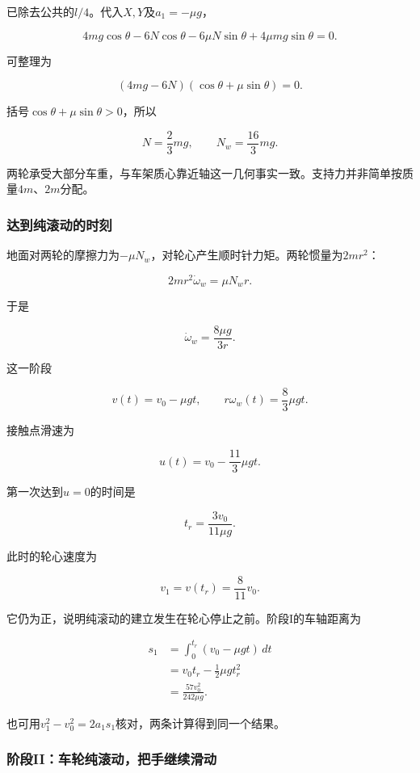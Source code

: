 \documentclass[12pt,a4paper,fontset=fandol]{ctexart}
\begin{document}
已除去公共的\(l/4\)。代入\(X,Y\)及\(a_1=-\mu g\)，

\[
4mg\cos\theta-6N\cos\theta
-6\mu N\sin\theta+4\mu mg\sin\theta=0.
\]

可整理为

\[
(4mg-6N)(\cos\theta+\mu\sin\theta)=0.
\]

括号\(\cos\theta+\mu\sin\theta>0\)，所以

\[
\boxed{N=\frac23mg,\qquad
N_w=\frac{16}{3}mg}.
\]

两轮承受大部分车重，与车架质心靠近轴这一几何事实一致。支持力并非简单按质量\(4m\)、\(2m\)分配。

\subsubsection{达到纯滚动的时刻}\label{ux8fbeux5230ux7eafux6edaux52a8ux7684ux65f6ux523b}

地面对两轮的摩擦力为\(-\mu N_w\)，对轮心产生顺时针力矩。两轮惯量为\(2mr^2\)：

\[
2mr^2\dot\omega_w=\mu N_wr.
\]

于是

\[
\boxed{\dot\omega_w=\frac{8\mu g}{3r}}.
\]

这一阶段

\[
v(t)=v_0-\mu gt,\qquad
r\omega_w(t)=\frac83\mu gt.
\]

接触点滑速为

\[
u(t)=v_0-\frac{11}{3}\mu gt.
\]

第一次达到\(u=0\)的时间是

\[
\boxed{t_r=\frac{3v_0}{11\mu g}}.
\]

此时的轮心速度为

\[
\boxed{v_1=v(t_r)=\frac8{11}v_0}.
\]

它仍为正，说明纯滚动的建立发生在轮心停止之前。阶段I的车轴距离为

\[
\begin{aligned}
s_1&=\int_0^{t_r}(v_0-\mu gt)\,dt\\
&=v_0t_r-\frac12\mu gt_r^2\\
&=\boxed{\frac{57v_0^2}{242\mu g}}.
\end{aligned}
\]

也可用\(v_1^2-v_0^2=2a_1s_1\)核对，两条计算得到同一个结果。

\subsubsection{阶段II：车轮纯滚动，把手继续滑动}\label{ux9636ux6bb5iiux8f66ux8f6eux7eafux6edaux52a8ux628aux624bux7ee7ux7eedux6ed1ux52a8}
\end{document}
